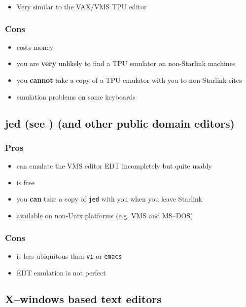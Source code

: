 \begin{itemize}
\item Very similar to the VAX/VMS TPU editor
\end{itemize}

\subsubsection*{Cons}

\begin{itemize}
\item costs money
\item you are {\bf very} unlikely to find a TPU emulator on non-Starlink machines
\item you {\bf cannot} take a copy of a TPU emulator with you to non-Starlink sites
\item emulation problems on some keyboards
\end{itemize}

\subsection{jed (see
) (and other public domain editors)}

\subsubsection*{Pros}

\begin{itemize}
\item can emulate the VMS editor EDT incompletely but quite usably
\item is free
\item you {\bf can} take a copy of \verb|jed| with you when you leave Starlink
\item available on non-Unix platforms (e.g. VMS and MS--DOS)
\end{itemize}

\subsubsection*{Cons}
\begin{itemize}
\item is less ubiquitous than \verb|vi| or \verb|emacs|
\item EDT emulation is not perfect 
\end{itemize}


\subsection{X--windows based text editors}

